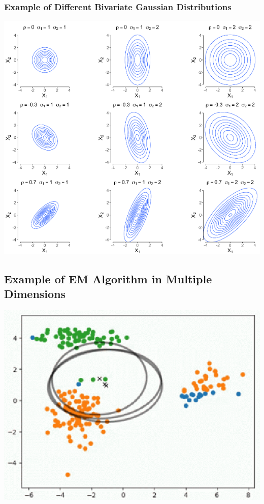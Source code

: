 \documentclass[10pt]{article}
\begin{document}
\subsubsection*{Example of Different Bivariate Gaussian Distributions}
\begin{center}
    \includegraphics*[scale=0.8]{W6_37.png}
\end{center}

\subsection*{Example of EM Algorithm in Multiple Dimensions}
\begin{center}
    \includegraphics*[scale=0.8]{W6_38.png}
\end{center}
\end{document}

